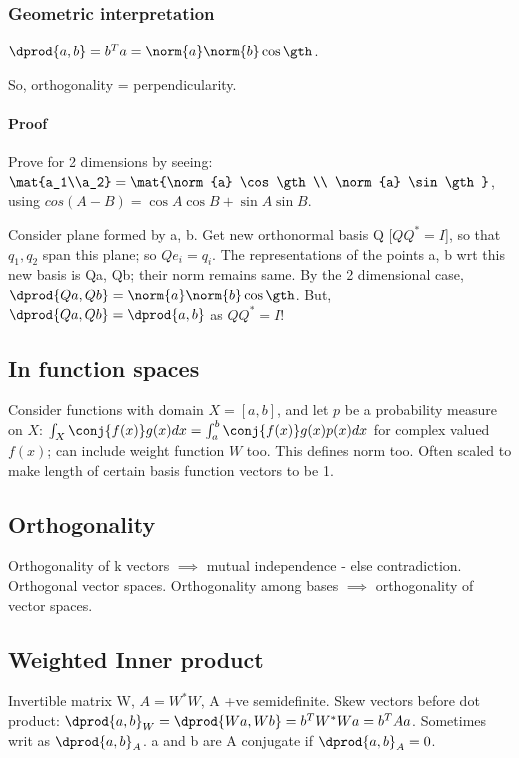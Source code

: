\documentclass[oneside, article]{memoir}
\begin{document}
\subsubsection{Geometric interpretation}
$\dprod{a,b} = b^{T}a = \norm{a}\norm{b} \cos \gth$.

So, orthogonality = perpendicularity.

\paragraph*{Proof}
Prove for 2 dimensions by seeing: $\mat{a_1\\a_2} = \mat{\norm{a} \cos \gth \\ \norm{a} \sin \gth}$, using $cos(A-B) = \cos A \cos B + \sin A \sin B$.

Consider plane formed by a, b. Get new orthonormal basis Q [$QQ^{*} = I$], so that $q_1, q_2$ span this plane; so $Qe_i = q_i$. The representations of the points a, b wrt this new basis is Qa, Qb; their norm remains same. By the 2 dimensional case, $\dprod{Qa, Qb} = \norm{a}\norm{b}\cos \gth$. But, $\dprod{Qa, Qb} = \dprod{a, b}$ as $QQ^{*}=I$!

\subsection{In function spaces}
Consider functions with domain $X = [a,b]$, and let $p$ be a probability measure on $X$: $\int_X \conj{f(x)}g(x)dx= \int_{a}^{b}\conj{f(x)}g(x)p(x)dx$ for complex valued $f(x)$; can include weight function $W$ too. This defines norm too. Often scaled to make length of certain basis function vectors to be 1.

\subsection{Orthogonality}
Orthogonality of k vectors $\implies$ mutual independence - else contradiction. Orthogonal vector spaces. Orthogonality among bases $\implies$ orthogonality of vector spaces.

\subsection{Weighted Inner product}
Invertible matrix W, $A=W^{*}W$, A +ve semidefinite. Skew vectors before dot product: $\dprod{a,b}_{W} = \dprod{Wa, Wb} = b^{T}W^{*}Wa = b^{T}Aa$. Sometimes writ as $\dprod{a,b}_{A}$. a and b are A conjugate if $\dprod{a,b}_{A}=0$.
\end{document}
